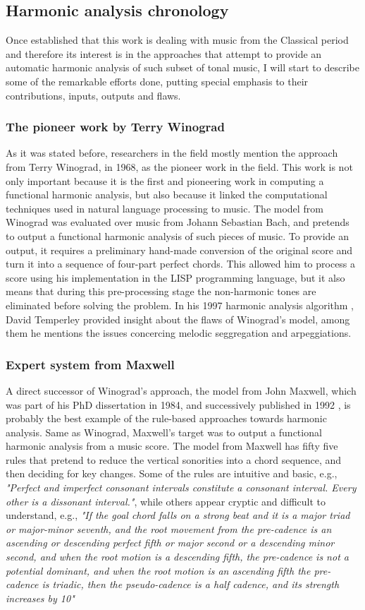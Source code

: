   \subsection{Harmonic analysis chronology}
  Once established that this work is dealing with music from the Classical period and therefore its interest is in the approaches that attempt to provide an automatic harmonic analysis of such subset of tonal music, I will start to describe some of the remarkable efforts done, putting special emphasis to their contributions, inputs, outputs and flaws.
    \subsubsection{The pioneer work by Terry Winograd}
    As it was stated before, researchers in the field mostly mention the approach from Terry Winograd, in 1968, as the pioneer work in the field. This work is not only important because it is the first and pioneering work in computing a functional harmonic analysis, but also because it linked the computational techniques used in natural language processing to music. The model from Winograd was evaluated over music from Johann Sebastian Bach, and pretends to output a functional harmonic analysis of such pieces of music. To provide an output, it requires a preliminary hand-made conversion of the original score and turn it into a sequence of four-part perfect chords. This allowed him to process a score using his implementation in the LISP programming language, but it also means that during this pre-processing stage the non-harmonic tones are eliminated before solving the problem. In his 1997 harmonic analysis algorithm \cite{temperley1997algorithm}, David Temperley provided insight about the flaws of Winograd's model, among them he mentions the issues concercing melodic seggregation and arpeggiations.
    \subsubsection{Expert system from Maxwell}
    A direct successor of Winograd's approach, the model from John Maxwell, which was part of his PhD dissertation in 1984, and successively published in 1992 \cite{maxwell1992expert}, is probably the best example of the rule-based approaches towards harmonic analysis. Same as Winograd, Maxwell's target was to output a functional harmonic analysis from a music score. The model from Maxwell has fifty five rules that pretend to reduce the vertical sonorities into a chord sequence, and then deciding for key changes. Some of the rules are intuitive and basic, e.g., \emph{"Perfect and imperfect consonant intervals constitute a consonant interval. Every other is a dissonant interval."}, while others appear cryptic and difficult to understand, e.g., \emph{"If the goal chord falls on a strong beat and it is a major triad or major-minor seventh, and the root movement from the pre-cadence is an ascending or descending perfect fifth or major second or a descending minor second, and when the root motion is a descending fifth, the pre-cadence is not a potential dominant, and when the root motion is an ascending fifth the pre-cadence is triadic, then the pseudo-cadence is a half cadence, and its strength increases by 10"} 
